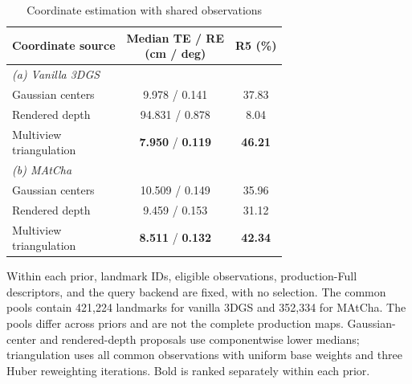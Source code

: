 \begin{table}[tp]
\centering
\footnotesize
\setlength{\tabcolsep}{4pt}
\renewcommand{\arraystretch}{1.12}
\caption{Coordinate estimation with shared observations}
\label{tab:t5}
\begin{tabular}{lcc}
\toprule
Coordinate source & \shortstack{Median TE / RE\\(cm / deg)} & R5 (\%) \\
\midrule
\multicolumn{3}{l}{\textit{(a) Vanilla 3DGS}} \\
Gaussian centers & 9.978 / 0.141 & 37.83 \\
Rendered depth & 94.831 / 0.878 & 8.04 \\
\shortstack[l]{Multiview\\triangulation} & \textbf{7.950} / \textbf{0.119} & \textbf{46.21} \\
\midrule
\multicolumn{3}{l}{\textit{(b) MAtCha}} \\
Gaussian centers & 10.509 / 0.149 & 35.96 \\
Rendered depth & 9.459 / 0.153 & 31.12 \\
\shortstack[l]{Multiview\\triangulation} & \textbf{8.511} / \textbf{0.132} & \textbf{42.34} \\
\bottomrule
\end{tabular}
\par\smallskip\begin{minipage}{0.98\linewidth}\footnotesize Within each prior, landmark IDs, eligible observations, production-Full descriptors, and the query backend are fixed, with no selection. The common pools contain 421,224 landmarks for vanilla 3DGS and 352,334 for MAtCha. The pools differ across priors and are not the complete production maps. Gaussian-center and rendered-depth proposals use componentwise lower medians; triangulation uses all common observations with uniform base weights and three Huber reweighting iterations. Bold is ranked separately within each prior.\end{minipage}
\end{table}

